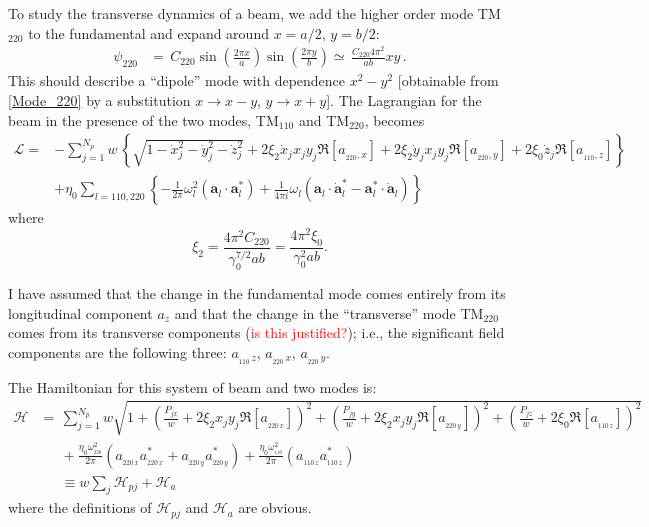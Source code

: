 \documentclass[11pt]{article}
\newcommand{\LL}{\mathcal{L}}
\newcommand{\HH}{\mathcal{H}}
\begin{document}
To study the transverse dynamics of a beam, we add the higher order mode TM$_{220}$ to the fundamental
and expand around $x=a/2$, $y=b/2$:
%
\begin{align}
\psi_{220} &=\, C_{220}\sin\!\left(\frac{2\pi x}{a} \right) \sin\!\left(\frac{2\pi y}{b} \right) %
\simeq\, \frac{C_{220}4\pi^2}{ab} xy\,.
\label{Mode_220}
\end{align}
%
This should describe a ``dipole'' mode with dependence $x^2-y^2$ [obtainable from \eqref{Mode_220} by a substitution
$x\rightarrow x-y$, $y\rightarrow x+y$]. 
The Lagrangian for the beam in the presence of the two modes, 
TM$_{110}$ and TM$_{220}$, becomes
%
\begin{align}
\LL =& -\sum_{j=1}^{N_p} w\,\left\{\sqrt{1-\dot{x}_j^2-\dot{y}_j^2-\dot{z}_j^2}  
+ 2\xi_{2}\dot{x}_j x_j y_j\Re[a_{_{220},x}] + 2\xi_{2}\dot{y}_jx_j y_j\Re[a_{_{220},y}] 
+ 2\xi_0\dot{z}_j \Re[a_{_{110},z}]
\right\} \nonumber\\
& + \eta_0 \sum_{l={{110},{220}}}\left\{ - \frac{1}{2\pi}\omega_{l}^2(\mathbf{a}_{l}\cdot \mathbf{a}_{l}^*)
+ \frac{1}{4\pi i} \omega_{l} (\mathbf{a}_{l}\cdot \dot{\mathbf{a}}_{l}^* 
- \mathbf{a}_{l}^* \cdot \dot{\mathbf{a}}_{l} ) \right\}
\label{L_transverse}
\end{align}
%
where 
%
\begin{equation}
\xi_2 = \frac{4\pi^2C_{220}}{\gamma_0^{7/2}ab} = \frac{4\pi^2\xi_0}{\gamma_0^2 ab}.
\end{equation}
%

I have assumed that the change in the fundamental mode comes entirely from its longitudinal component $a_z$
and that the change in the ``transverse'' mode TM$_{220}$ comes from its transverse components 
(\textcolor{red}{is this justified?}); i.e., the significant field components are the following three:
$a_{_{110}\,z}$, $a_{_{220}\, x}$, $a_{_{220}\, y}$.

The Hamiltonian for this system of beam and two modes is:
%
\begin{align}
\HH &=\, \sum_{j=1}^{N_p}w\sqrt{1+\left(\frac{P_{jx}}{w}+2\xi_2x_jy_j\Re[a_{_{220\, x}}] \right)^2 
+\left(\frac{P_{jy}}{w}+2\xi_2x_jy_j\Re[a_{_{220\, y}}] \right)^2 
+ \left(\frac{P_{jz}}{w}+2\xi_0\Re[a_{_{110\, z}}] \right)^2  } \nonumber \\
&\phantom{=\,} 
+ \frac{\eta_0\omega_{_{220}}^2}{2\pi}\left(a_{_{220\, x}}a_{_{220\, x}}^* + a_{_{220\, y}}a_{_{220\, y}}^* \right)
+ \frac{\eta_0\omega_{_{110}}^2}{2\pi}\left(a_{_{110\, z}}a_{_{110\, z}}^* \right) 
\label{Hamiltonian_two_mode} \\
&\phantom{=\,}  \equiv w\sum_j\HH_{pj} + \HH_a
\label{Hamiltonian_two_mode_abbrev}
\end{align}
%
where the definitions of $\HH_{pj}$ and $\HH_a$ are obvious.
\end{document}
